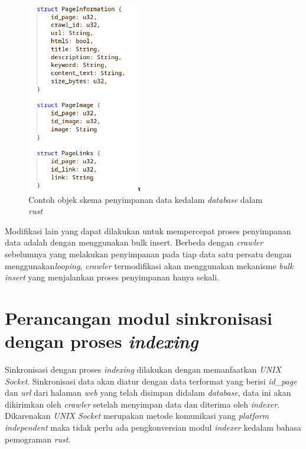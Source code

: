 \begin{figure}[H]
	\centering
	\includegraphics[keepaspectratio, width=5cm]{gambar/rust-db-struct.png}
  \caption{Contoh objek skema penyimpanan data kedalam \emph{database} dalam \emph{rust}}
	\label{gambar:unix_sock_indexer}
\end{figure}

Modifikasi lain yang dapat dilakukan untuk mempercepat proses penyimpanan data adalah dengan menggunakan bulk insert. Berbeda dengan \emph{crawler} sebelumnya yang melakukan penyimpanan pada tiap data satu persatu dengan menggunakan\emph{looping}, \emph{crawler} termodifikasi akan menggunakan mekanisme \emph{bulk insert} yang menjalankan proses penyimpanan hanya sekali.

\section{Perancangan modul sinkronisasi dengan proses \emph{indexing}}

Sinkronisasi dengan proses \emph{indexing} dilakukan dengan memanfaatkan \emph{UNIX Socket}. Sinkronisasi data akan diatur dengan data terformat yang berisi \emph{id\_page} dan \emph{url} dari halaman \emph{web} yang telah disimpan didalam \emph{database}, data ini akan dikirimkan oleh \emph{crawler} setelah menyimpan data dan diterima oleh \emph{indexer}. Dikarenakan \emph{UNIX Socket} merupakan metode komunikasi yang \emph{platform independent} maka tidak perlu ada pengkonversian modul \emph{indexer} kedalam bahasa pemograman \emph{rust}. 

